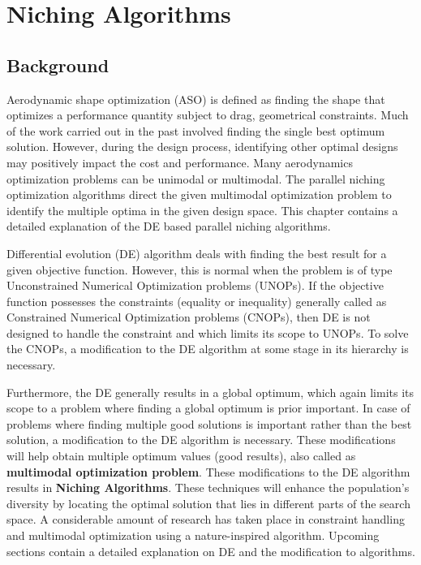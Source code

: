 \chapter{Niching Algorithms}
\label{niching}
\section{Background}
Aerodynamic shape optimization (ASO) is defined as finding the shape that optimizes a performance quantity subject to drag, geometrical constraints. Much of the work carried out in the past involved finding the single best optimum solution. However, during the design process, identifying other optimal designs may positively impact the cost and performance. Many aerodynamics optimization problems can be unimodal or multimodal. The parallel niching optimization algorithms direct the given multimodal optimization problem to identify the multiple optima in the given design space. This chapter contains a detailed explanation of the DE based parallel niching algorithms.

Differential evolution (DE) algorithm deals with finding the best result for a given objective function. However, this is normal when the problem is of type Unconstrained Numerical Optimization problems (UNOPs). If the objective function possesses the constraints (equality or inequality) generally called as Constrained Numerical Optimization problems (CNOPs), then DE is not designed to handle the constraint and which limits its scope to UNOPs. To solve the CNOPs, a modification to the DE algorithm at some stage in its hierarchy is necessary.

 Furthermore, the DE generally results in a global optimum, which again limits its scope to a problem where finding a global optimum is prior important. In case of problems where finding multiple good solutions is important rather than the best solution, a modification to the DE algorithm is necessary. These modifications will help obtain multiple optimum values (good results), also called as \textbf{multimodal optimization problem}. These modifications to the DE algorithm results in \textbf{Niching Algorithms}. These techniques will enhance the population’s diversity by locating the optimal solution that lies in different parts of the search space. A considerable amount of research has taken place in constraint handling and multimodal optimization using a nature-inspired algorithm. Upcoming sections contain a detailed explanation  on DE and the modification to algorithms.


